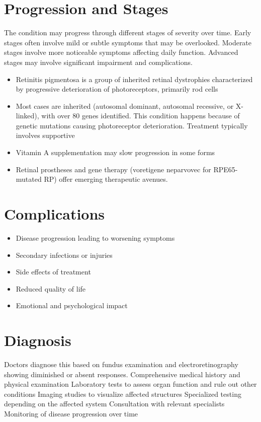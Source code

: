 \section{Progression and Stages}
The condition may progress through different stages of severity over time. Early stages often involve mild or subtle symptoms that may be overlooked. Moderate stages involve more noticeable symptoms affecting daily function. Advanced stages may involve significant impairment and complications.

\begin{itemize}[noitemsep]
  \item Retinitis pigmentosa is a group of inherited retinal dystrophies characterized by progressive deterioration of photoreceptors, primarily rod cells
  \item Most cases are inherited (autosomal dominant, autosomal recessive, or X-linked), with over 80 genes identified. This condition happens because of genetic mutations causing photoreceptor deterioration. Treatment typically involves supportive
  \item Vitamin A supplementation may slow progression in some forms
  \item Retinal prostheses and gene therapy (voretigene neparvovec for RPE65-mutated RP) offer emerging therapeutic avenues.
\end{itemize}
\section{Complications}
\begin{itemize}[noitemsep]
  \item Disease progression leading to worsening symptoms
  \item Secondary infections or injuries
  \item Side effects of treatment
  \item Reduced quality of life
  \item Emotional and psychological impact
\end{itemize}
\section{Diagnosis}
Doctors diagnose this based on fundus examination and electroretinography showing diminished or absent responses. Comprehensive medical history and physical examination Laboratory tests to assess organ function and rule out other conditions Imaging studies to visualize affected structures Specialized testing depending on the affected system Consultation with relevant specialists Monitoring of disease progression over time


